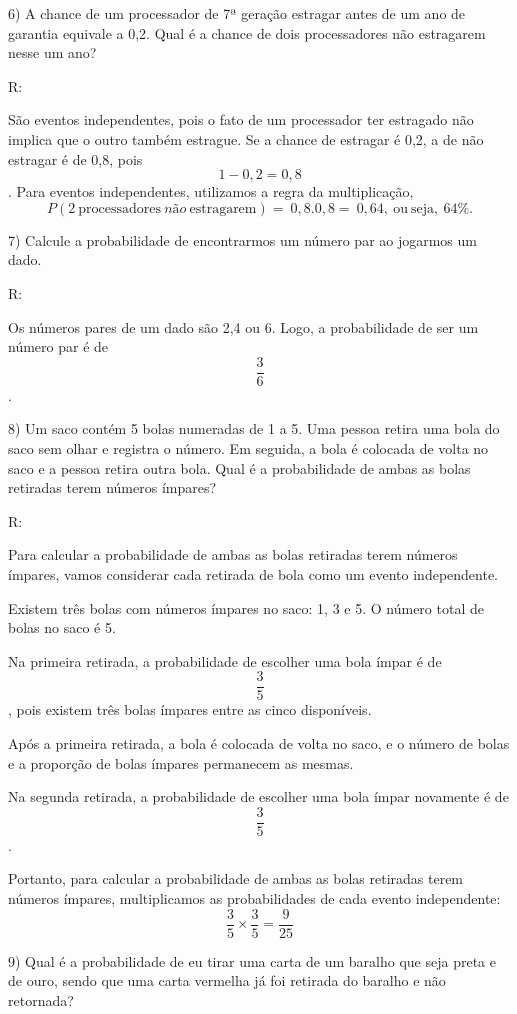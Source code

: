 6) A chance de um processador de 7ª geração estragar antes de um ano de
garantia equivale a 0,2. Qual é a chance de dois processadores não
estragarem nesse um ano?

R:

São eventos independentes, pois o fato de um processador ter estragado
não implica que o outro também estrague. Se a chance de estragar é 0,2,
a de não estragar é de 0,8, pois \[1 - 0,2 = 0,8\]. Para eventos
independentes, utilizamos a regra da multiplicação,
\[P(2\ \text{processad}\text{ores}\ não\ \text{estragarem}) = \ 0,8.0,8 = \ 0,64,\ \text{ou}\ \text{seja},\ 64\%.\]

7) Calcule a probabilidade de encontrarmos um número par ao jogarmos um
dado.

R:

Os números pares de um dado são 2,4 ou 6. Logo, a probabilidade de ser
um número par é de \[\frac{3}{6}\].

8) Um saco contém 5 bolas numeradas de 1 a 5. Uma pessoa retira uma bola
do saco sem olhar e registra o número. Em seguida, a bola é colocada de
volta no saco e a pessoa retira outra bola. Qual é a probabilidade de
ambas as bolas retiradas terem números ímpares?

R:

Para calcular a probabilidade de ambas as bolas retiradas terem números
ímpares, vamos considerar cada retirada de bola como um evento
independente.

Existem três bolas com números ímpares no saco: 1, 3 e 5. O número total
de bolas no saco é 5.

Na primeira retirada, a probabilidade de escolher uma bola ímpar é de
\[\frac {3}{5}\], pois existem três bolas ímpares entre as cinco
disponíveis.

Após a primeira retirada, a bola é colocada de volta no saco, e o número
de bolas e a proporção de bolas ímpares permanecem as mesmas.

Na segunda retirada, a probabilidade de escolher uma bola ímpar
novamente é de \[\frac {3}{5}\].

Portanto, para calcular a probabilidade de ambas as bolas retiradas
terem números ímpares, multiplicamos as probabilidades de cada evento
independente: \[\frac {3}{5} \times \frac {3}{5} = \frac {9}{25}\]

9) Qual é a probabilidade de eu tirar uma carta de um baralho que seja
preta e de ouro, sendo que uma carta vermelha já foi retirada do baralho
e não retornada?

